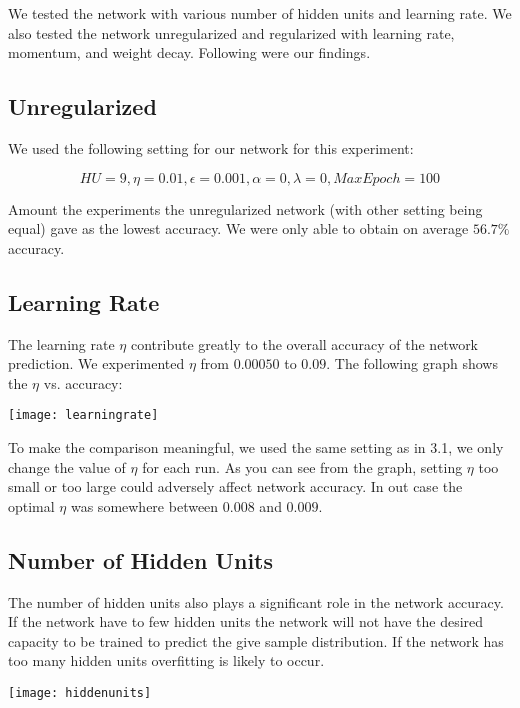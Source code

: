 \documentclass{article}
\begin{document}
We tested the network with various number of hidden units and learning rate. We also tested the network unregularized and regularized with learning rate, momentum, and weight decay. Following were our findings. 

\subsection{Unregularized}
We used the following setting for our network for this experiment:

\begin{equation*}
HU=9, \eta=0.01, \epsilon=0.001, \alpha=0, \lambda=0, MaxEpoch=100
\end{equation*}

Amount the experiments the unregularized network (with other setting being equal) gave as the lowest accuracy. We were only able to obtain on average $56.7\%$ accuracy.

\subsection{Learning Rate}
The learning rate $\eta$ contribute greatly to the overall accuracy of the network prediction. We experimented $\eta$ from $0.00050$ to $0.09$. The following graph shows the $\eta$ vs. accuracy:

\begin{center}
 \texttt{[image: learningrate]}
\end{center}

To make the comparison meaningful, we used the same setting as in 3.1, we only change the value of $\eta$ for each run. As you can see from the graph, setting $\eta$ too small or too large could adversely affect network accuracy. In out case the optimal $\eta$ was somewhere between $0.008$ and $0.009$.

\subsection{Number of Hidden Units}
The number of hidden units also plays a significant role in the network accuracy. If the network have to few hidden units the network will not have the desired capacity to be trained to predict the give sample distribution. If the network has too many hidden units overfitting is likely to occur.

\begin{center}
 \texttt{[image: hiddenunits]}
\end{center}
\end{document}
